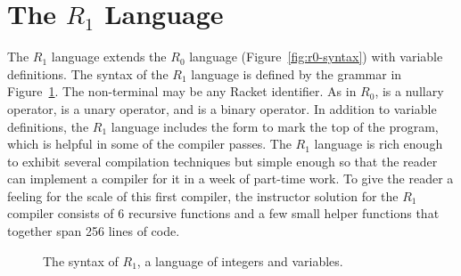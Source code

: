 \documentclass[11pt]{book}
\begin{document}
\section{The $R_1$ Language}
\label{sec:s0}

The $R_1$ language extends the $R_0$ language
(Figure~\ref{fig:r0-syntax}) with variable definitions.  The syntax of
the $R_1$ language is defined by the grammar in
Figure~\ref{fig:r1-syntax}.  The non-terminal \Var{} may be any Racket
identifier. As in $R_0$,  is a nullary operator, \key{-} is
a unary operator, and \key{+} is a binary operator. In addition to
variable definitions, the $R_1$ language includes the 
form to mark the top of the program, which is helpful in some of the
compiler passes.  The $R_1$ language is rich enough to exhibit several
compilation techniques but simple enough so that the reader can
implement a compiler for it in a week of part-time work.  To give the
reader a feeling for the scale of this first compiler, the instructor
solution for the $R_1$ compiler consists of 6 recursive functions and
a few small helper functions that together span 256 lines of code.

\begin{figure}[btp]
\centering
{}
\caption{The syntax of $R_1$, a language of integers and variables.}
\label{fig:r1-syntax}
\end{figure}
\end{document}
